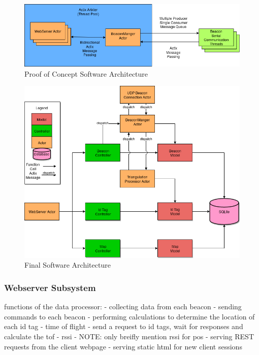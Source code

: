 \begin{figure}[H]
	\centering
    \includegraphics[scale=0.6]{images/poc_arch.png}
    \caption{Proof of Concept Software Architecture}
    \label{software_poc_arch}
\end{figure}

\begin{figure}[H]
	\centering
    \includegraphics[scale=0.6]{images/prototype_software_arch.png}
    \caption{Final Software Architecture}
    \label{software_final_arch}
\end{figure}

\bigskip
\subsubsection{Webserver Subsystem}

functions of the data processor:
	- collecting data from each beacon
	- sending commands to each beacon
	- performing calculations to determine the location of each id tag
		- time of flight
			- send a request to id tags, wait for responses and calculate the tof
		- rssi
			- NOTE: only breifly mention rssi for pos
	- serving REST requests from the client webpage
	- serving static html for new client sessions

